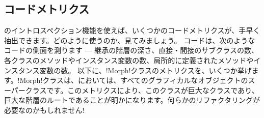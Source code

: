 \documentclass[a4paper,10pt,twoside]{book}
\begin{document}
\important{\emph{警告:}いくらこれらの機能が、とりわけ開発ツールを定義するのに便利だからと言っても、これらは通常、典型的なアプリケーションには適していません。
オブジェクトに、それが属するクラスを尋ねたり、オブジェクトがどのようなメッセージを理解するかを見つけ出そうと、それにクエリを送ったりすることは、典型的な設計上の欠陥を示すものです。なぜならそれは、カプセル化の原則を破る行為だからです。
開発ツールは、しかしながら、通常のアプリケーションではありません。なぜなら、開発ツールは、ソフトウェアそれ自身を対象領域とするものだからです。それで、これらのツールは、コードの内部の詳細について、深く掘り下げることを許されているのです。}%


\subsection{コードメトリクス}

\st{}のイントロスペクション機能を使えば、いくつかのコードメトリクスが、手早く抽出できます。どのように使うのか、見てみましょう。
コードは、次のようなコードの側面を測ります --- 継承の階層の深さ、直接・間接のサブクラスの数、各クラスのメソッドやインスタンス変数の数、局所的に定義されたメソッドやインスタンス変数の数。
以下に、\ct!Morph!クラスのメトリクスを、いくつか挙げます。\ct!Morph!クラスは、\pharo においては、すべてのグラフィカルなオブジェクトのスーパークラスです。このメトリクスにより、このクラスが巨大なクラスであり、巨大な階層のルートであることが明かになります。何らかのリファクタリングが必要なのかもしれません! 
\end{document}

